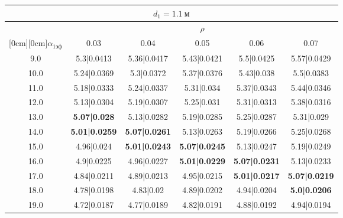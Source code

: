 \documentclass[20pt]{article}
\begin{document}
\begin{center}
\begin{tabular}{c|ccccc}
\hline
	\multicolumn{6}{c}{$d_{1}=1.1 \ м$} \\
\hline
	 & \multicolumn{5}{|c}{$\rho$} \\
	\cline{2-6}
	\raisebox{1.5ex}[0cm][0cm]{$\alpha_{1эф}$} & 0.03 & 0.04 & 0.05 & 0.06 & 0.07\\
\hline
	9.0 & 	5.3|0.0413 & 	5.36|0.0417 & 	5.43|0.0421 & 	5.5|0.0425 & 	5.57|0.0429\\
	10.0 & 	5.24|0.0369 & 	5.3|0.0372 & 	5.37|0.0376 & 	5.43|0.038 & 	5.5|0.0383\\
	11.0 & 	5.18|0.0333 & 	5.24|0.0337 & 	5.31|0.034 & 	5.37|0.0343 & 	5.44|0.0346\\
	12.0 & 	5.13|0.0304 & 	5.19|0.0307 & 	5.25|0.031 & 	5.31|0.0313 & 	5.38|0.0316\\
	13.0 & 	\textbf{5.07|0.028} & 	5.13|0.0282 & 	5.19|0.0285 & 	5.25|0.0287 & 	5.31|0.029\\
	14.0 & 	\textbf{5.01|0.0259} & 	\textbf{5.07|0.0261} & 	5.13|0.0263 & 	5.19|0.0266 & 	5.25|0.0268\\
	15.0 & 	4.96|0.024 & 	\textbf{5.01|0.0243} & 	\textbf{5.07|0.0245} & 	5.13|0.0247 & 	5.19|0.0249\\
	16.0 & 	4.9|0.0225 & 	4.96|0.0227 & 	\textbf{5.01|0.0229} & 	\textbf{5.07|0.0231} & 	5.13|0.0233\\
	17.0 & 	4.84|0.0211 & 	4.89|0.0213 & 	4.95|0.0215 & 	\textbf{5.01|0.0217} & 	\textbf{5.07|0.0219}\\
	18.0 & 	4.78|0.0198 & 	4.83|0.02 & 	4.89|0.0202 & 	4.94|0.0204 & 	\textbf{5.0|0.0206}\\
	19.0 & 	4.72|0.0187 & 	4.77|0.0189 & 	4.82|0.0191 & 	4.88|0.0192 & 	4.94|0.0194\\
\end{tabular}


\end{center}
\end{document}
